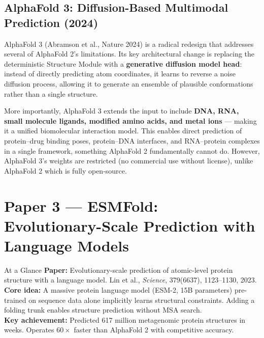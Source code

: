 ﻿\documentclass[12pt,a4paper]{article}
\begin{document}
\subsection{AlphaFold 3: Diffusion-Based Multimodal Prediction (2024)}

AlphaFold 3 (Abramson et al., Nature 2024) is a radical redesign that addresses several of AlphaFold 2's limitations. Its key architectural change is replacing the deterministic Structure Module with a \textbf{generative diffusion model head}: instead of directly predicting atom coordinates, it learns to reverse a noise diffusion process, allowing it to generate an ensemble of plausible conformations rather than a single structure.

More importantly, AlphaFold 3 extends the input to include \textbf{DNA, RNA, small molecule ligands, modified amino acids, and metal ions} --- making it a unified biomolecular interaction model. This enables direct prediction of protein--drug binding poses, protein--DNA interfaces, and RNA--protein complexes in a single framework, something AlphaFold 2 fundamentally cannot do. However, AlphaFold 3's weights are restricted (no commercial use without license), unlike AlphaFold 2 which is fully open-source.


\newpage
\section{Paper 3 --- ESMFold: Evolutionary-Scale Prediction with Language Models}

\begin{keybox}{At a Glance}
\textbf{Paper:} Evolutionary-scale prediction of atomic-level protein structure with a language model. Lin et al., \textit{Science}, 379(6637), 1123--1130, 2023.\\
\textbf{Core idea:} A massive protein language model (ESM-2, 15B parameters) pre-trained on sequence data alone implicitly learns structural constraints. Adding a folding trunk enables structure prediction without MSA search.\\
\textbf{Key achievement:} Predicted 617 million metagenomic protein structures in weeks. Operates $60\times$ faster than AlphaFold 2 with competitive accuracy.
\end{keybox}
\end{document}
